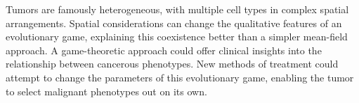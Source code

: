 \documentclass[12pt]{report}
\begin{document}
Tumors are famously heterogeneous, with multiple cell types in complex spatial arrangements. Spatial considerations can change the qualitative features of an evolutionary game, explaining this coexistence better than a simpler mean-field approach. A game-theoretic approach could offer clinical insights into the relationship between cancerous phenotypes. New methods of treatment could attempt to change the parameters of this evolutionary game, enabling the tumor to select malignant phenotypes out on its own.\\




\newpage 

\end{document}
